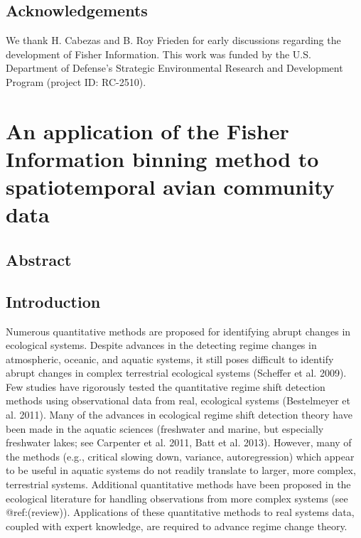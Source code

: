 \documentclass[12pt,twoside]{reedthesis}
\begin{document}
\section{Acknowledgements}\label{acknowledgements-1}

We thank H. Cabezas and B. Roy Frieden for early discussions regarding
the development of Fisher Information. This work was funded by the U.S.
Department of Defense's Strategic Environmental Research and Development
Program (project ID: RC-2510).

\chapter{An application of the Fisher Information binning method to
spatiotemporal avian community
data}\label{an-application-of-the-fisher-information-binning-method-to-spatiotemporal-avian-community-data}

\section{Abstract}\label{abstract-1}

\section{Introduction}\label{introduction-2}

Numerous quantitative methods are proposed for identifying abrupt
changes in ecological systems. Despite advances in the detecting regime
changes in atmospheric, oceanic, and aquatic systems, it still poses
difficult to identify abrupt changes in complex terrestrial ecological
systems (Scheffer et al. 2009). Few studies have rigorously tested the
quantitative regime shift detection methods using observational data
from real, ecological systems (Bestelmeyer et al. 2011). Many of the
advances in ecological regime shift detection theory have been made in
the aquatic sciences (freshwater and marine, but especially freshwater
lakes; see Carpenter et al. 2011, Batt et al. 2013). However, many of
the methods (e.g., critical slowing down, variance, autoregression)
which appear to be useful in aquatic systems do not readily translate to
larger, more complex, terrestrial systems. Additional quantitative
methods have been proposed in the ecological literature for handling
observations from more complex systems (see @ref:(review)). Applications
of these quantitative methods to real systems data, coupled with expert
knowledge, are required to advance regime change theory.
\end{document}
